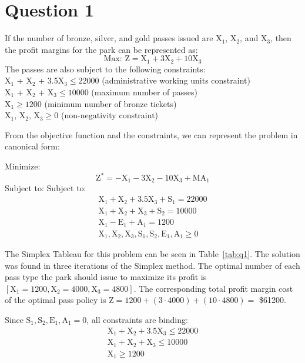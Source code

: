 \section*{Question 1}
If the number of bronze, silver, and gold passes issued are X$_1$, X$_2$, and X$_3$, then the profit margins for the park can be represented as:
\begin{equation*}
	\text{Max: } \text{Z} = \text{X}_1 + 3\text{X}_2 + 10\text{X}_3
\end{equation*}
The passes are also subject to the following constraints:\\
X$_1$ + X$_2$ + 3.5X$_3 \leq 22000$ (administrative working units constraint)\\
X$_1$ + X$_2$ + X$_3 \leq 10000$ (maximum number of passes)\\
X$_1 \geq 1200$ (minimum number of bronze tickets)\\
X$_1$, X$_2$, X$_3 \geq 0$ (non-negativity constraint)

From the objective function and the constraints, we can represent the problem in canonical form:

Minimize:
\begin{equation*}
	\text{Z}^* = -\text{X}_1 - 3\text{X}_2 - 10\text{X}_3 + \text{MA}_1
\end{equation*}
Subject to:
Subject to:
\begin{gather*}
	\text{X}_1 + \text{X}_2 + 3.5\text{X}_3 + \text{S}_1 = 22000 \\
	\text{X}_1 + \text{X}_2 + \text{X}_3 + \text{S}_2 = 10000 \\
	\text{X}_1 - \text{E}_1 + \text{A}_1 = 1200 \\
	\text{X}_1, \text{X}_2, \text{X}_3, \text{S}_1, \text{S}_2, \text{E}_1, \text{A}_1 \geq 0
\end{gather*}

The Simplex Tableau for this problem can be seen in Table~\ref{tab:q1}. The solution was found in three iterations of the Simplex method. The optimal number of each pass type the park should issue to maximize its profit is $[\text{X}_1 = 1200, \text{X}_2 = 4000, \text{X}_3 = 4800]$. The corresponding total profit margin cost of the optimal pass policy is $\text{Z} = 1200 + (3 \cdot 4000) + (10 \cdot 4800) =$ \$61200.

Since $\text{S}_1, \text{S}_2, \text{E}_1, \text{A}_1 = 0$, all constraints are binding:
\begin{gather*}
	\text{X}_1 + \text{X}_2 + 3.5\text{X}_3 \leq 22000 \\
	\text{X}_1 + \text{X}_2 + \text{X}_3 \leq 10000 \\
	\text{X}_1 \geq 1200 \\
\end{gather*}


